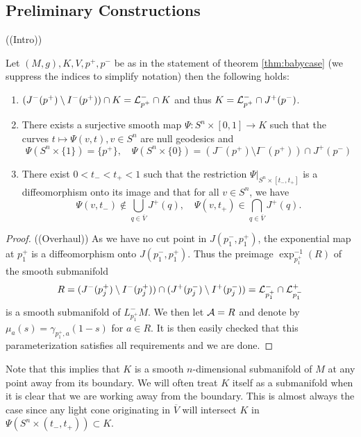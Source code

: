 \subsection{Preliminary Constructions}
((Intro))
\begin{lemma}\label{lem:Kcharact}
    Let $(M,g), K, V, p^+,p^-$ be as in the statement of theorem \ref{thm:babycase} (we suppress the indices to simplify notation) then the following holds:
    \begin{enumerate}[label={\textnormal{(\arabic*)}}]
        \item $(J^-(p^+)\setminus I^-(p^+)) \cap K = \mathcal{L}^-_{p^+} \cap K$ and thus $K = \mathcal{L}^-_{p^+} \cap J^+(p^-)$.
        \item There exists a surjective smooth map $\Psi:S^n\times[0,1] \to K$ such that the curves $t\mapsto\Psi(v,t), v\in S^n$ are null geodesics and \[\Psi(S^n\times\{1\}) = \{p^+\}, \quad \Psi(S^n\times\{0\}) = (J^-(p^+)\setminus I^-(p^+)) \cap J^+(p^-)\]
        \item There exist $0<t_-<t_+<1$ such that the restriction $\Psi\rvert_{S^n\times[t_-,t_+]}$ is a diffeomorphism onto its image and that for all $v \in S^n$, we have 
        \[
        \Psi(v,t_-) \notin \bigcup_{q\in \overline{V}} J^+(q), \quad \Psi(v,t_+) \in \bigcap_{q\in \overline{V}} J^+(q).
        \]
    \end{enumerate}
\end{lemma}
\begin{proof}
((Overhaul))
As we have no cut point in $J(p_1^-,p_1^+)$, the exponential map at $p_1^+$ is a diffeomorphism onto $J(p_1^-,p_1^+)$. Thus the preimage $\exp^{-1}_{p_1^+}(R)$ of the smooth submanifold
\[
    R = (J^-(p_j^+)\setminus I^-(p_j^+)) \cap (J^+(p_j^-)\setminus I^+(p_j^-)) = \mathcal{L}^-_{p_1^+} \cap \mathcal{L}^+_{p_1^-}
\]
is a smooth submanifold of $L^-_{p^+_1}M$. We then let $\mathcal{A}=R$ and denote by $\mu_a(s) = \gamma_{p_1^+,a}(1-s)$ for $a\in R$. It is then easily checked that this parameterization satisfies all requirements and we are done.
\end{proof}

Note that this implies that $K$ is a smooth $n$-dimensional submanifold of $M$ at any point away from its boundary. We will often treat $K$ itself as a submanifold when it is clear that we are working away from the boundary. This is almost always the case since any light cone originating in $\overline{V}$ will intersect $K$ in $\Psi(S^n\times(t_-,t_+))\subset K$.

